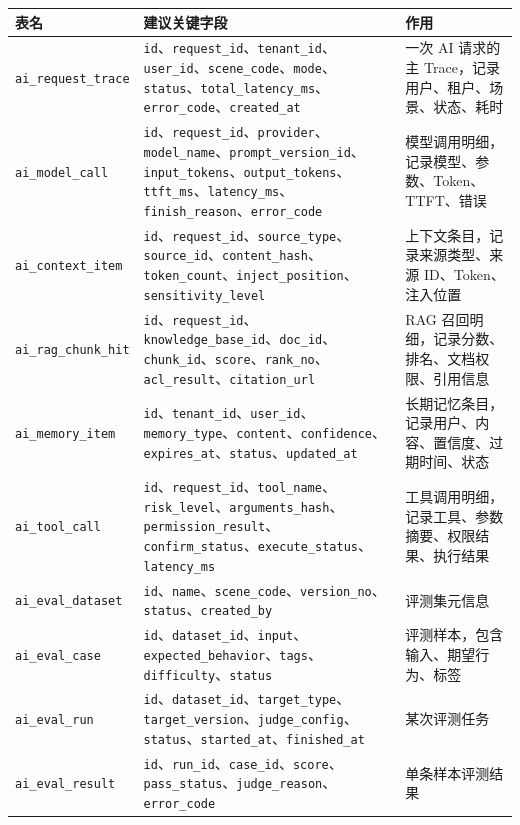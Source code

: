 \documentclass[10pt,a4paper]{ctexart}
\begin{document}
{\footnotesize
\begin{tabularx}{\textwidth}{|X|X|X|}
\hline
\textbf{表名} & \textbf{建议关键字段} & \textbf{作用} \\
\hline
\texttt{ai\_request\_trace} & \texttt{id}、\texttt{request\_id}、\texttt{tenant\_id}、\texttt{user\_id}、\texttt{scene\_code}、\texttt{mode}、\texttt{status}、\texttt{total\_latency\_ms}、\texttt{error\_code}、\texttt{created\_at} & 一次 AI 请求的主 Trace，记录用户、租户、场景、状态、耗时 \\
\hline
\texttt{ai\_model\_call} & \texttt{id}、\texttt{request\_id}、\texttt{provider}、\texttt{model\_name}、\texttt{prompt\_version\_id}、\texttt{input\_tokens}、\texttt{output\_tokens}、\texttt{ttft\_ms}、\texttt{latency\_ms}、\texttt{finish\_reason}、\texttt{error\_code} & 模型调用明细，记录模型、参数、Token、TTFT、错误 \\
\hline
\texttt{ai\_context\_item} & \texttt{id}、\texttt{request\_id}、\texttt{source\_type}、\texttt{source\_id}、\texttt{content\_hash}、\texttt{token\_count}、\texttt{inject\_position}、\texttt{sensitivity\_level} & 上下文条目，记录来源类型、来源 ID、Token、注入位置 \\
\hline
\texttt{ai\_rag\_chunk\_hit} & \texttt{id}、\texttt{request\_id}、\texttt{knowledge\_base\_id}、\texttt{doc\_id}、\texttt{chunk\_id}、\texttt{score}、\texttt{rank\_no}、\texttt{acl\_result}、\texttt{citation\_url} & RAG 召回明细，记录分数、排名、文档权限、引用信息 \\
\hline
\texttt{ai\_memory\_item} & \texttt{id}、\texttt{tenant\_id}、\texttt{user\_id}、\texttt{memory\_type}、\texttt{content}、\texttt{confidence}、\texttt{expires\_at}、\texttt{status}、\texttt{updated\_at} & 长期记忆条目，记录用户、内容、置信度、过期时间、状态 \\
\hline
\texttt{ai\_tool\_call} & \texttt{id}、\texttt{request\_id}、\texttt{tool\_name}、\texttt{risk\_level}、\texttt{arguments\_hash}、\texttt{permission\_result}、\texttt{confirm\_status}、\texttt{execute\_status}、\texttt{latency\_ms} & 工具调用明细，记录工具、参数摘要、权限结果、执行结果 \\
\hline
\texttt{ai\_eval\_dataset} & \texttt{id}、\texttt{name}、\texttt{scene\_code}、\texttt{version\_no}、\texttt{status}、\texttt{created\_by} & 评测集元信息 \\
\hline
\texttt{ai\_eval\_case} & \texttt{id}、\texttt{dataset\_id}、\texttt{input}、\texttt{expected\_behavior}、\texttt{tags}、\texttt{difficulty}、\texttt{status} & 评测样本，包含输入、期望行为、标签 \\
\hline
\texttt{ai\_eval\_run} & \texttt{id}、\texttt{dataset\_id}、\texttt{target\_type}、\texttt{target\_version}、\texttt{judge\_config}、\texttt{status}、\texttt{started\_at}、\texttt{finished\_at} & 某次评测任务 \\
\hline
\texttt{ai\_eval\_result} & \texttt{id}、\texttt{run\_id}、\texttt{case\_id}、\texttt{score}、\texttt{pass\_status}、\texttt{judge\_reason}、\texttt{error\_code} & 单条样本评测结果 \\
\hline
\end{tabularx}
}
\end{document}
